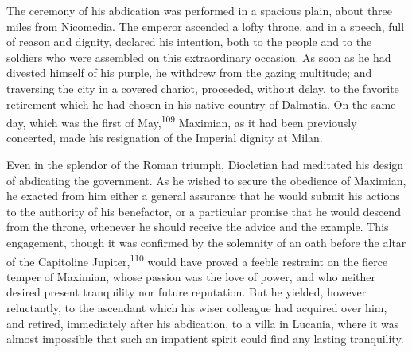 The ceremony of his abdication was performed in a spacious plain,
about three miles from Nicomedia. The emperor ascended a lofty
throne, and in a speech, full of reason and dignity, declared his
intention, both to the people and to the soldiers who were
assembled on this extraordinary occasion. As soon as he had
divested himself of his purple, he withdrew from the gazing
multitude; and traversing the city in a covered chariot,
proceeded, without delay, to the favorite retirement which he had
chosen in his native country of Dalmatia. On the same day, which
was the first of May,\textsuperscript{109} Maximian, as it had been previously
concerted, made his resignation of the Imperial dignity at Milan.

Even in the splendor of the Roman triumph, Diocletian had
meditated his design of abdicating the government. As he wished
to secure the obedience of Maximian, he exacted from him either a
general assurance that he would submit his actions to the
authority of his benefactor, or a particular promise that he
would descend from the throne, whenever he should receive the
advice and the example. This engagement, though it was confirmed
by the solemnity of an oath before the altar of the Capitoline
Jupiter,\textsuperscript{110} would have proved a feeble restraint on the fierce
temper of Maximian, whose passion was the love of power, and who
neither desired present tranquility nor future reputation. But he
yielded, however reluctantly, to the ascendant which his wiser
colleague had acquired over him, and retired, immediately after
his abdication, to a villa in Lucania, where it was almost
impossible that such an impatient spirit could find any lasting
tranquility.



